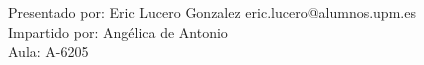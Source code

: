 \begin{flushleft}
    \vspace{-1.75em}
    {\color{gray} Presentado por: Eric Lucero Gonzalez \hfill eric.lucero@alumnos.upm.es} \\
    {\color{gray} Impartido por: Angélica de Antonio \\Aula: A-6205}
\end{flushleft}
\vspace{-4em}

